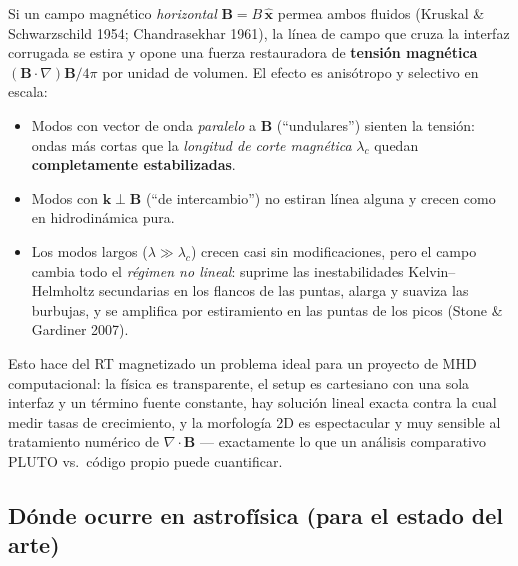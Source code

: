\documentclass[11pt,a4paper]{article}
\newcommand{\B}{\mathbf{B}}
\begin{document}
Si un campo magnético \emph{horizontal} $\B=B\,\hat{\mathbf{x}}$ permea ambos fluidos
(Kruskal \& Schwarzschild 1954; Chandrasekhar 1961), la línea de campo que cruza la interfaz
corrugada se estira y opone una fuerza restauradora de \textbf{tensión magnética}
$(\B\cdot\nabla)\B/4\pi$ por unidad de volumen. El efecto es anisótropo y selectivo en escala:

\begin{itemize}[nosep]
  \item Modos con vector de onda \emph{paralelo} a $\B$ (``undulares'') sienten la tensión:
  ondas más cortas que la \emph{longitud de corte magnética} $\lambda_c$ quedan
  \textbf{completamente estabilizadas}.
  \item Modos con $\mathbf{k}\perp\B$ (``de intercambio'') no estiran línea alguna y crecen
  como en hidrodinámica pura.
  \item Los modos largos ($\lambda\gg\lambda_c$) crecen casi sin modificaciones, pero el campo
  cambia todo el \emph{régimen no lineal}: suprime las inestabilidades Kelvin--Helmholtz
  secundarias en los flancos de las puntas, alarga y suaviza las burbujas, y se amplifica por
  estiramiento en las puntas de los picos (Stone \& Gardiner 2007).
\end{itemize}

Esto hace del RT magnetizado un problema ideal para un proyecto de MHD computacional: la física
es transparente, el setup es cartesiano con una sola interfaz y un término fuente constante,
hay solución lineal exacta contra la cual medir tasas de crecimiento, y la morfología 2D es
espectacular y muy sensible al tratamiento numérico de $\nabla\cdot\B$ --- exactamente lo que
un análisis comparativo PLUTO vs.\ código propio puede cuantificar.

\subsection{Dónde ocurre en astrofísica (para el estado del arte)}
\end{document}

